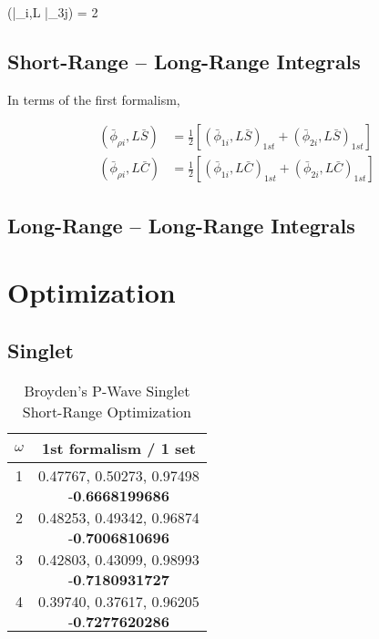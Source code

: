 \documentclass[Dissertation.tex]{subfiles}
\begin{document}
\beq
\nonumber \left(\bar{\phi}_{\rho i},L \bar{\phi}_{3j}\right) = 2 
\eeq

\subsection{Short-Range -- Long-Range Integrals}
\label{sec:PWave2ndShortLong}
In terms of the first formalism,

\begin{subequations}
\begin{align}
\left(\bar{\phi}_{\rho i},L \bar{S}\right) &= \frac{1}{2} \left[ \left(\bar{\phi}_{1i},L \bar{S}\right)_{1st} + \left(\bar{\phi}_{2i},L \bar{S}\right)_{1st} \right] \\
\left(\bar{\phi}_{\rho i},L \bar{C}\right) &= \frac{1}{2} \left[ \left(\bar{\phi}_{1i},L \bar{C}\right)_{1st} + \left(\bar{\phi}_{2i},L \bar{C}\right)_{1st} \right]
\end{align}
\end{subequations}


\subsection{Long-Range -- Long-Range Integrals}
\label{sec:PWave2ndLongLong}


\section{Optimization}
\label{sec:PWaveOpt}

\subsection{Singlet}

\begin{table}[H]
\begin{center}
\begin{tabular}{c c}
\toprule
\toprule
$\omega$ & 1st formalism / 1 set \\
\midrule
\midrule
1 & 0.47767, 0.50273, 0.97498 \\
  & $\textbf{-0.6668199686}$ \\
\midrule
2 & 0.48253, 0.49342, 0.96874 \\
  & $\textbf{-0.7006810696}$ \\
\midrule
3 & 0.42803, 0.43099, 0.98993 \\
  & $\textbf{-0.7180931727}$ \\
\midrule
4 & 0.39740, 0.37617, 0.96205 \\
  & $\textbf{-0.7277620286}$ \\
\bottomrule
\bottomrule
\end{tabular}
\caption{Broyden's P-Wave Singlet Short-Range Optimization}
\label{tab:BroydenPWaveSingOpt}
\end{center}
\end{table}
\end{document}
